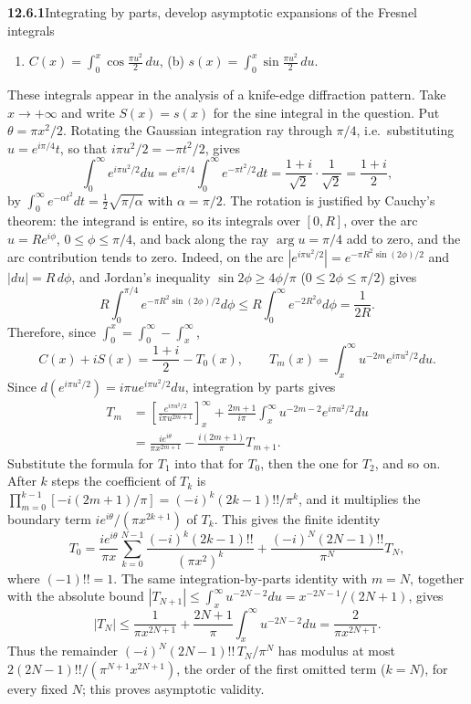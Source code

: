 \par\bigskip
\noindent\textbf{12.6.1}\quad Integrating by parts, develop asymptotic
expansions  of the Fresnel integrals
\begin{enumerate}
\item[(a)] $\displaystyle C(x)=\int_{0}^{x}\cos\frac{\pi u^{2}}{2}\,du$,\quad
(b) $\displaystyle s(x)=\int_{0}^{x}\sin\frac{\pi u^{2}}{2}\,du$.
\end{enumerate}
These integrals appear in the analysis of a knife-edge diffraction pattern.
\solution
Take $x\to+\infty$ and write $S(x)=s(x)$ for the sine integral in the
question. Put $\theta=\pi x^2/2$. Rotating the Gaussian integration
ray through $\pi/4$, i.e.\ substituting $u=e^{i\pi/4}t$, so that
$i\pi u^2/2=-\pi t^2/2$, gives
\[
\int_0^\infty e^{i\pi u^2/2}du
=e^{i\pi/4}\int_0^\infty e^{-\pi t^2/2}dt
=\frac{1+i}{\sqrt2}\cdot\frac1{\sqrt2}
=\frac{1+i}{2},
\]
by $\int_0^\infty e^{-\alpha t^2}dt=\frac12\sqrt{\pi/\alpha}$ with
$\alpha=\pi/2$. The rotation is justified by Cauchy's theorem: the
integrand is entire, so its integrals over $[0,R]$, over the arc
$u=Re^{i\phi}$, $0\le\phi\le\pi/4$, and back along the ray
$\arg u=\pi/4$ add to zero, and the arc contribution tends to zero.
Indeed, on the arc $|e^{i\pi u^2/2}|=e^{-\pi R^2\sin(2\phi)/2}$ and
$|du|=R\,d\phi$, and Jordan's inequality $\sin2\phi\ge4\phi/\pi$
($0\le2\phi\le\pi/2$) gives
\[
R\int_0^{\pi/4}e^{-\pi R^2\sin(2\phi)/2}d\phi
\le R\int_0^\infty e^{-2R^2\phi}d\phi=\frac1{2R}.
\]
Therefore, since $\int_0^x=\int_0^\infty-\int_x^\infty$,
\[
C(x)+iS(x)=\frac{1+i}{2}-T_0(x),\qquad
T_m(x)=\int_x^\infty u^{-2m}e^{i\pi u^2/2}du.
\]
Since $d(e^{i\pi u^2/2})=i\pi u e^{i\pi u^2/2}du$, integration by
parts gives
\begin{align*}
T_m&=\left[\frac{e^{i\pi u^2/2}}{i\pi u^{2m+1}}\right]_x^\infty
 +\frac{2m+1}{i\pi}\int_x^\infty u^{-2m-2}e^{i\pi u^2/2}du\\
&=\frac{i e^{i\theta}}{\pi x^{2m+1}}
 -\frac{i(2m+1)}\pi T_{m+1}.
\end{align*}
Substitute the formula for $T_1$ into that for $T_0$, then the one for
$T_2$, and so on. After $k$ steps the coefficient of $T_k$ is
$\prod_{m=0}^{k-1}[-i(2m+1)/\pi]=(-i)^k(2k-1)!!/\pi^k$, and it
multiplies the boundary term $ie^{i\theta}/(\pi x^{2k+1})$ of $T_k$.
This gives the finite identity
\[
T_0=\frac{i e^{i\theta}}{\pi x}
\sum_{k=0}^{N-1}\frac{(-i)^k(2k-1)!!}{(\pi x^2)^k}
+\frac{(-i)^N(2N-1)!!}{\pi^N}T_N,
\]
where $(-1)!!=1$. The same integration-by-parts identity with $m=N$,
together with the absolute bound
$|T_{N+1}|\le\int_x^\infty u^{-2N-2}du=x^{-2N-1}/(2N+1)$, gives
\[
|T_N|\le\frac1{\pi x^{2N+1}}
+\frac{2N+1}{\pi}\int_x^\infty u^{-2N-2}du
=\frac2{\pi x^{2N+1}}.
\]
Thus the remainder $(-i)^N(2N-1)!!\,T_N/\pi^N$ has modulus at most
$2(2N-1)!!/(\pi^{N+1}x^{2N+1})$, the order of the first omitted term
($k=N$), for every fixed $N$; this proves asymptotic validity.

